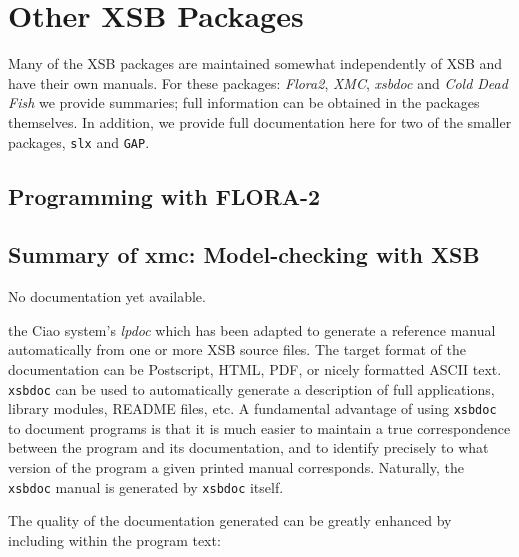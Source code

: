 \chapter{Other XSB Packages} \label{sec:otherpackages}

Many of the XSB packages are maintained somewhat independently of XSB
and have their own manuals.  For these packages: {\em Flora2}, {\em
  XMC}, {\em xsbdoc} and {\em Cold Dead Fish} we provide summaries;
full information can be obtained in the packages themselves.  In
addition, we provide full documentation here for two of the smaller
packages, {\tt slx} and {\tt GAP}.

\section{ Programming with FLORA-2}
\label{package:flora2} 




\section{Summary of xmc: Model-checking with XSB}
\label{package:xmc} 

No documentation yet available.

the Ciao \cite{ciao-man} system's {\em lpdoc} which has been adapted
to generate a reference manual automatically from one or more XSB
source files.  The target format of the documentation can be
Postscript, HTML, PDF, or nicely formatted ASCII text.  {\tt xsbdoc}
can be used to automatically generate a description of full
applications, library modules, README files, etc.  A fundamental
advantage of using {\tt xsbdoc} to document programs is that it is
much easier to maintain a true correspondence between the program and
its documentation, and to identify precisely to what version of the
program a given printed manual corresponds.  Naturally, the {\tt
xsbdoc} manual is generated by {\tt xsbdoc} itself.

The quality of the documentation generated can be greatly enhanced by
including within the program text:

